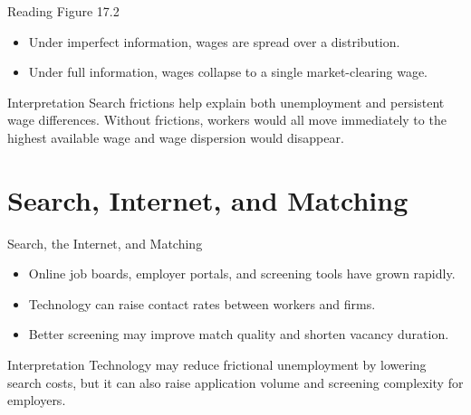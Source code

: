 \documentclass[aspectratio=169]{beamer}
\begin{document}
\begin{frame}{Reading Figure 17.2}
\transfade
\begin{itemize}[<+->]
  \item Under imperfect information, wages are spread over a distribution.
  \item Under full information, wages collapse to a single market-clearing wage.
\end{itemize}

\begin{block}{Interpretation}
Search frictions help explain both unemployment and persistent wage differences. Without frictions, workers would all move immediately to the highest available wage and wage dispersion would disappear.
\end{block}
\end{frame}

\section{Search, Internet, and Matching}

\begin{frame}{Search, the Internet, and Matching}
\transfade
\begin{itemize}[<+->]
  \item Online job boards, employer portals, and screening tools have grown rapidly.
  \item Technology can raise contact rates between workers and firms.
  \item Better screening may improve match quality and shorten vacancy duration.
\end{itemize}

\begin{block}{Interpretation}
Technology may reduce frictional unemployment by lowering search costs, but it can also raise application volume and screening complexity for employers.
\end{block}
\end{frame}
\end{document}
